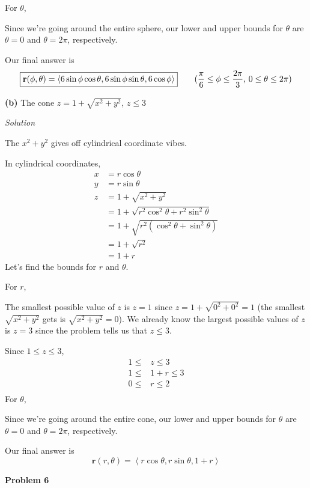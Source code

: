 \documentclass{article}
\newcommand{\lra}[1]{\left\langle #1 \right\rangle}
\renewcommand{\r}[0]{\mathbf{r}}
\newcommand{\Solution}{\textit{Solution}}
\begin{document}
For $\theta$,

Since we're going around the entire sphere, our lower and upper bounds for $\theta$ are $\theta=0$ and $\theta=2\pi$, respectively.

Our final answer is
\begin{equation}
    \boxed{\r(\phi,\theta)=\lra{6\sin\phi\cos\theta,6\sin\phi\sin\theta, 6\cos\phi}}\tag{$\displaystyle\frac{\pi}{6}\leq \phi\leq \frac{2\pi}{3}$, $\displaystyle 0\leq \theta\leq 2\pi$}
\end{equation}

{}\textbf{(b)} The cone $z=1+\sqrt{x^2+y^2}$, $z\leq 3$

\Solution

The $x^2+y^2$ gives off cylindrical coordinate vibes.

In cylindrical coordinates,
\begin{align*}
    x&=r\cos\theta\\
    y&=r\sin\theta\\
    z&=1+\sqrt{x^2+y^2}\\
   &= 1+\sqrt{r^2\cos^2\theta+r^2\sin^2\theta}\\
    &=1+\sqrt{r^2(\cos^2\theta+\sin^2\theta)}\\
    &=1+\sqrt{r^2}\tag{$\cos^2\theta+\sin^2\theta=1$}\\
    &=1+r\tag{$r\geq 0$ always}
\end{align*}
Let's find the bounds for $r$ and $\theta$.

For $r$,

The smallest possible value of $z$ is $z=1$ since $z=1+\sqrt{0^2+0^2}=1$ (the smallest $\sqrt{x^2+y^2}$ gets is $\sqrt{x^2+y^2}=0$). We already know the largest possible values of $z$ is $z=3$ since the problem tells us that $z\leq 3$.

Since $1\leq z \leq 3$,
\begin{align*}
    1 \leq & z \leq 3\\
    1 \leq & 1 + r \leq 3\\
    0 \leq & r \leq 2 \\
\end{align*}
For $\theta$,

Since we're going around the entire cone, our lower and upper bounds for $\theta$ are $\theta=0$ and $\theta=2\pi$, respectively.

Our final answer is
\begin{equation*}
    \boxed{\r(r,\theta)=\lra{r\cos\theta, r\sin\theta, 1+r}}\tag{$0\leq r\leq 2$, $0\leq \theta\leq2\pi$}
\end{equation*}
{}\textbf{Problem 6}
\end{document}

